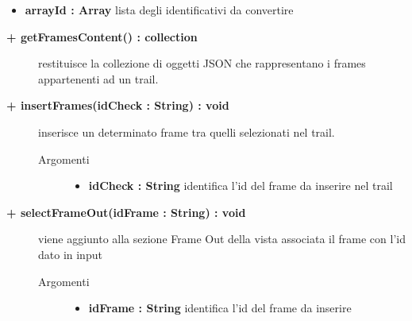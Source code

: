 \begin{description}
\begin{description}
\begin{description}
\begin{itemize}
					\item \textbf{arrayId : Array			} \hfill
						lista degli identificativi da convertire
					
				\end{itemize}
		\end{description}
	\end{description}
	
	\begin{description}
		\item[\textbf{\color{blue}+ getFramesContent() : collection			}] \hfill
			restituisce la collezione di oggetti JSON che rappresentano i frames appartenenti ad un trail.
			
	\end{description}
	
	\begin{description}
		\item[\textbf{\color{blue}+ insertFrames(idCheck : String) : void			}] \hfill
			inserisce un determinato frame tra quelli selezionati nel trail.
			
		\begin{description}
			\item[Argomenti] \hfill
				\begin{itemize}
				
					\item \textbf{idCheck : String			} \hfill
						identifica l'id del frame da inserire nel trail
					
				\end{itemize}
		\end{description}
	\end{description}
	
	\begin{description}
		\item[\textbf{\color{blue}+ selectFrameOut(idFrame : String) : void			}] \hfill
			viene aggiunto alla sezione Frame Out della vista associata il frame con l'id dato in input
			
		\begin{description}
			\item[Argomenti] \hfill
				\begin{itemize}
				
					\item \textbf{idFrame : String			} \hfill
						identifica l'id del frame da inserire
					

\end{itemize}
\end{description}
\end{description}
\end{description}
